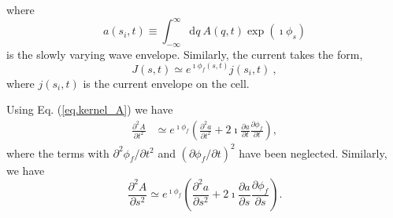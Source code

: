 where 
\begin{equation}
 a(s_i, t) \equiv \int_{-\infty}^{\infty} \mathrm{d} q~A(q, t)
\exp(\imath\phi_{s})
\end{equation}
 is the slowly varying wave envelope.
Similarly,
the  current takes the form,
\begin{equation}\label{eq.kernel_j}
J(s,t)\simeq e^{\imath \phi_f(s,t)}  j(s_i, t)~,
\end{equation}
where  $j(s_i,t)$ is the current envelope on the cell.  

Using Eq. (\ref{eq.kernel_A}) 
we have 
\begin{equation}
    \begin{aligned}
    \frac{\partial^2  A}{\partial t^2} &\simeq %
     e^{\imath \phi_f} \left(\frac{\partial^2 a}{\partial t^2} + 2 \imath \frac{\partial a}{\partial t}\frac{\partial \phi_f}{\partial t} %
     \right),
    \end{aligned}
\end{equation}
where the terms with 
$\partial^2 \phi_f/\partial t^2$ and $(\partial \phi_f/\partial t)^2$
have been neglected. %
Similarly, we have
\begin{equation}
    \frac{\partial^2  A}{\partial s^2}  \simeq e^{\imath \phi_f} \left(\frac{\partial^2 a}{\partial s^2} + 2 \imath \frac{\partial a}{\partial s}\frac{\partial \phi_f}{\partial s} %
    \right).
\end{equation}
